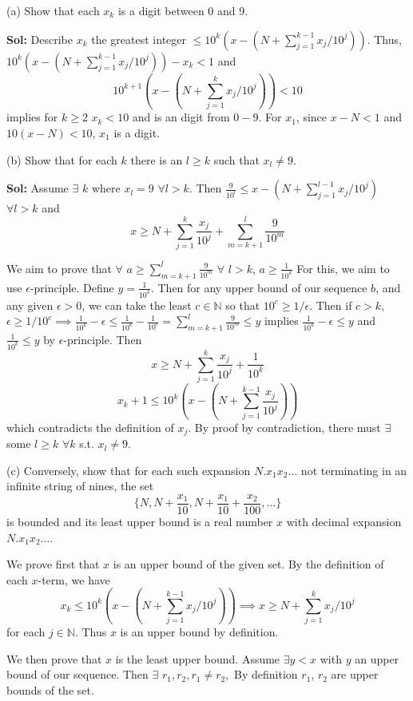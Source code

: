 \documentclass{amsart}
\begin{document}
\indent (a) Show that each $x_k$ is a digit between 0 and 9.

\medskip
\noindent \textbf{Sol:} Describe $x_k$ the greatest integer $\leq 10^k(x-(N+\sum\limits_{j=1}^{k-1}x_j/10^j))$. Thus, 
$10^k(x-(N+\sum\limits_{j=1}^{k-1}x_j/10^j))-x_k<1$ and $$10^{k+1}(x-(N+\sum\limits_{j=1}^kx_j/10^j))<10$$ implies for $k\geq 2$ $x_k<10$ and
is an digit from $0-9$. For $x_1$, since $x-N<1$ and $10(x-N)<10$, $x_1$ is a digit.  

\bigskip

\indent (b) Show that for each $k$ there is an $l\geq k$ such that $x_l\neq 9$.

\medskip
\noindent \textbf{Sol:} Assume $\exists$ $k$ where $x_l = 9$ $\forall l > k$. Then $\frac{9}{10^l}\leq x-(N+\sum\limits_{j=1}^{l-1}x_j/10^j)$ 
$\forall l > k$ and $$x\geq N+\sum\limits^k_{j=1}\frac{x_j}{10^j}+\sum\limits^l_{m=k+1}\frac{9}{10^m}$$ 

\medskip
\noindent We aim to prove that $\forall$ $a\geq\sum\limits^l_{m=k+1}\frac{9}{10^m}$ $\forall$ $l>k$, $a\geq\frac{1}{10^k}$ For this, we aim 
to use $\epsilon$-principle. Define $y = \frac{1}{10^k}$. Then for any upper bound of our sequence $b$, and any given $\epsilon>0$, we can
take the least $c\in\mathbb{N}$ so that $10^c\geq1/\epsilon$. Then if $c>k$, $\epsilon\geq1/10^c\implies
\frac{1}{10^k}-\epsilon\leq\frac{1}{10^k}-\frac{1}{10^c}=\sum\limits^l_{m=k+1}\frac{9}{10^m}\leq y$ implies $\frac{1}{10^k}-\epsilon\leq y$
and $\frac{1}{10^k} \leq y$ by $\epsilon$-principle. Then $$x\geq N+\sum\limits^k_{j=1}\frac{x_j}{10^j}+\frac{1}{10^k}$$ 
$$x_k+1\leq 10^k(x-(N+\sum\limits_{j=1}^{k-1}\frac{x_j}{10^j}))$$ which contradicts the definition of $x_j$. By proof by 
contradiction, there must $\exists$ some $l\geq k$ $\forall k$ s.t. $x_l\neq 9$. 


\bigskip

\indent (c) Conversely, show that for each such expansion $N.x_1x_2\dots$ not terminating in an infinite
string of nines, the set $$\{N, N+\frac{x_1}{10}, N+\frac{x_1}{10}+\frac{x_2}{100}, \dots\}$$ is bounded 
and its least upper bound is a real number $x$ with decimal expansion $N.x_1x_2\dots$.

\noindent We prove first that $x$ is an upper bound of the given set. By the definition of each $x$-term, we have 
$$x_k\leq 10^k(x-(N+\sum\limits_{j=1}^{k-1}x_j/10^j))\implies x\geq N+\sum_{j=1}^{k}x_j/10^j$$ for each 
$j\in\mathbb{N}$. Thus $x$ is an upper bound by definition. 

\medskip
\noindent We then prove that $x$ is the least upper bound. Assume $\exists y<x$ with $y$ an upper bound of
our sequence. Then $\exists$ $r_1, r_2, r_1\neq r_2,$ By definition $r_1$, $r_2$ are upper bounds of the set.
\end{document}
